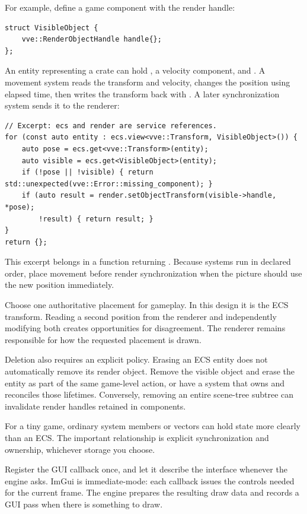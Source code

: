 \documentclass[11pt,a4paper]{article}
\begin{document}
For example, define a game component with the render handle:
\begin{lstlisting}
struct VisibleObject {
    vve::RenderObjectHandle handle{};
};
\end{lstlisting}
An entity representing a crate can hold , a velocity component, and . A movement system reads the transform and velocity, changes the position using elapsed time, then writes the transform back with . A later synchronization system sends it to the renderer:
\begin{lstlisting}
// Excerpt: ecs and render are service references.
for (const auto entity : ecs.view<vve::Transform, VisibleObject>()) {
    auto pose = ecs.get<vve::Transform>(entity);
    auto visible = ecs.get<VisibleObject>(entity);
    if (!pose || !visible) { return std::unexpected(vve::Error::missing_component); }
    if (auto result = render.setObjectTransform(visible->handle, *pose);
        !result) { return result; }
}
return {};
\end{lstlisting}
This excerpt belongs in a function returning . Because systems run in declared order, place movement before render synchronization when the picture should use the new position immediately.

Choose one authoritative placement for gameplay. In this design it is the ECS transform. Reading a second position from the renderer and independently modifying both creates opportunities for disagreement. The renderer remains responsible for how the requested placement is drawn.

Deletion also requires an explicit policy. Erasing an ECS entity does not automatically remove its render object. Remove the visible object and erase the entity as part of the same game-level action, or have a system that owns and reconciles those lifetimes. Conversely, removing an entire scene-tree subtree can invalidate render handles retained in components.

For a tiny game, ordinary system members or vectors can hold state more clearly than an ECS. The important relationship is explicit synchronization and ownership, whichever storage you choose.

Register the GUI callback once, and let it describe the interface whenever the engine asks. ImGui is immediate-mode: each callback issues the controls needed for the current frame. The engine prepares the resulting draw data and records a GUI pass when there is something to draw.
\end{document}
